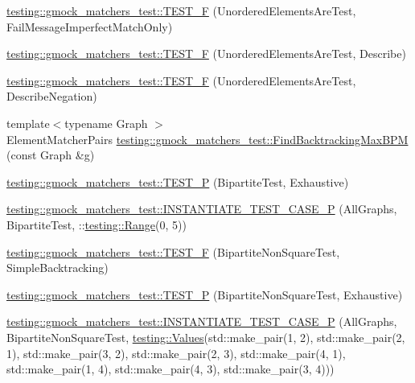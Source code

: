 \begin{DoxyCompactItemize}
\item 
\mbox{\hyperlink{namespacetesting_1_1gmock__matchers__test_ac70f9f9717f35352349b076654094f6a}{testing\+::gmock\+\_\+matchers\+\_\+test\+::\+T\+E\+S\+T\+\_\+F}} (Unordered\+Elements\+Are\+Test, Fail\+Message\+Imperfect\+Match\+Only)
\item 
\mbox{\hyperlink{namespacetesting_1_1gmock__matchers__test_a937f4d835023cd6322eb7d32596f3f43}{testing\+::gmock\+\_\+matchers\+\_\+test\+::\+T\+E\+S\+T\+\_\+F}} (Unordered\+Elements\+Are\+Test, Describe)
\item 
\mbox{\hyperlink{namespacetesting_1_1gmock__matchers__test_a3c4c92b68a08c5d541e46ed367e216ab}{testing\+::gmock\+\_\+matchers\+\_\+test\+::\+T\+E\+S\+T\+\_\+F}} (Unordered\+Elements\+Are\+Test, Describe\+Negation)
\item 
{\footnotesize template$<$typename Graph $>$ }\\Element\+Matcher\+Pairs \mbox{\hyperlink{namespacetesting_1_1gmock__matchers__test_a09321a8d4a4c40ab1e369fbdf92b0414}{testing\+::gmock\+\_\+matchers\+\_\+test\+::\+Find\+Backtracking\+Max\+B\+PM}} (const Graph \&g)
\item 
\mbox{\hyperlink{namespacetesting_1_1gmock__matchers__test_a20589d957fcfe5399e249084dbc23e82}{testing\+::gmock\+\_\+matchers\+\_\+test\+::\+T\+E\+S\+T\+\_\+P}} (Bipartite\+Test, Exhaustive)
\item 
\mbox{\hyperlink{namespacetesting_1_1gmock__matchers__test_a16ff96ce4f97da6215f889baccd57e87}{testing\+::gmock\+\_\+matchers\+\_\+test\+::\+I\+N\+S\+T\+A\+N\+T\+I\+A\+T\+E\+\_\+\+T\+E\+S\+T\+\_\+\+C\+A\+S\+E\+\_\+P}} (All\+Graphs, Bipartite\+Test, \+::\mbox{\hyperlink{namespacetesting_a265ed70a86cf2d6641582c45ad9529e2}{testing\+::\+Range}}(0, 5))
\item 
\mbox{\hyperlink{namespacetesting_1_1gmock__matchers__test_a7d2395b1cb6a90bdc8d46ae06f99f6c7}{testing\+::gmock\+\_\+matchers\+\_\+test\+::\+T\+E\+S\+T\+\_\+F}} (Bipartite\+Non\+Square\+Test, Simple\+Backtracking)
\item 
\mbox{\hyperlink{namespacetesting_1_1gmock__matchers__test_a3ac913ed55a7ac2636ae7bfce04296e9}{testing\+::gmock\+\_\+matchers\+\_\+test\+::\+T\+E\+S\+T\+\_\+P}} (Bipartite\+Non\+Square\+Test, Exhaustive)
\item 
\mbox{\hyperlink{namespacetesting_1_1gmock__matchers__test_a64ef722e930c3088ddea704ac20194b5}{testing\+::gmock\+\_\+matchers\+\_\+test\+::\+I\+N\+S\+T\+A\+N\+T\+I\+A\+T\+E\+\_\+\+T\+E\+S\+T\+\_\+\+C\+A\+S\+E\+\_\+P}} (All\+Graphs, Bipartite\+Non\+Square\+Test, \mbox{\hyperlink{namespacetesting_a8209ef59db08b8ad4beed30d8d6e6a88}{testing\+::\+Values}}(std\+::make\+\_\+pair(1, 2), std\+::make\+\_\+pair(2, 1), std\+::make\+\_\+pair(3, 2), std\+::make\+\_\+pair(2, 3), std\+::make\+\_\+pair(4, 1), std\+::make\+\_\+pair(1, 4), std\+::make\+\_\+pair(4, 3), std\+::make\+\_\+pair(3, 4)))

\end{DoxyCompactItemize}
